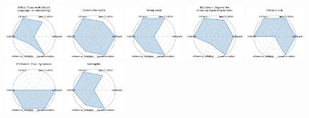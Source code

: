 
\begin{figure}[ht!]
\centering
\includegraphics[width=0.1900\textwidth]{images/mmlu_massive_multitask_language_understanding_radar.pdf}
\includegraphics[width=0.1900\textwidth]{images/commonsenseqa_radar.pdf}
\includegraphics[width=0.1900\textwidth]{images/winogrande_radar.pdf}
\includegraphics[width=0.1900\textwidth]{images/big-bench_beyond_the_imitation_game_benchmark_radar.pdf}
\includegraphics[width=0.1900\textwidth]{images/climatelearn_radar.pdf}
\\[1ex]
\includegraphics[width=0.1900\textwidth]{images/cfdbench_fluid_dynamics_radar.pdf}
\includegraphics[width=0.1900\textwidth]{images/satimgnet_radar.pdf}

\end{figure}
